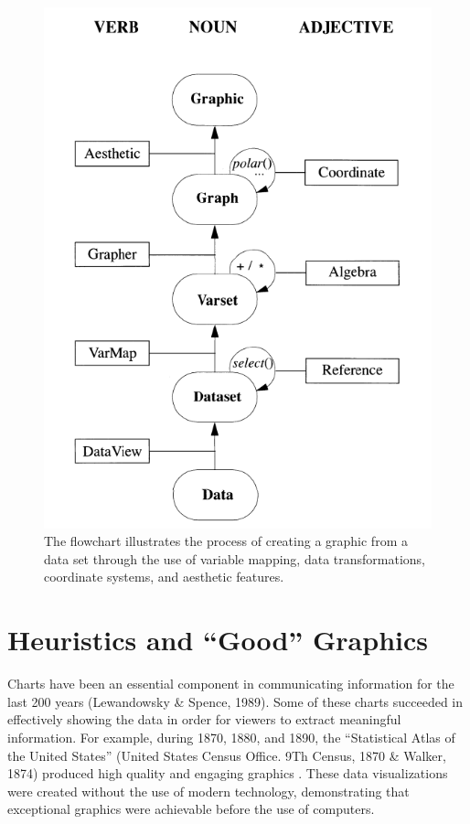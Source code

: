 \documentclass[print]{nuthesis}
\begin{document}
\begin{figure}[tbp]

{\centering \includegraphics[width=0.5\linewidth,]{images/graphic-flowchart} 

}

\caption[Graphic flowchart]{The flowchart illustrates the process of creating a graphic from a data set through the use of variable mapping, data transformations, coordinate systems, and aesthetic features.}\label{fig:graphic-flowchart}
\end{figure}

\hypertarget{good-graphics}{%
\section{Heuristics and ``Good'' Graphics}\label{good-graphics}}

Charts have been an essential component in communicating information for the last 200 years (Lewandowsky \& Spence, 1989).
Some of these charts succeeded in effectively showing the data in order for viewers to extract meaningful information.
For example, during 1870, 1880, and 1890, the ``Statistical Atlas of the United States'' (United States Census Office. 9Th Census, 1870 \& Walker, 1874) produced high quality and engaging graphics .
These data visualizations were created without the use of modern technology, demonstrating that exceptional graphics were achievable before the use of computers.
\end{document}
